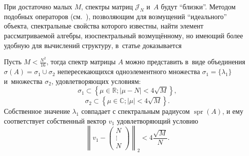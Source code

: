 При достаточно малых \( M \),
 спектры матриц \( \mathcal{J}_N \) и~\( A \) будут ``близки''.
Методом подобных операторов (см.~\cite{baskakov-harmonic,baskakov1983}),
 позволяющим для возмущений ``идеального'' объекта, спектральные свойства которого известны,
 найти элемент рассматриваемой алгебры, изоспектральный возмущ\"енному,
 но имеющий более удобную для вычислений структуру,
 в~статье доказывается
\begin{thm}\label{kozlukovsv:thm:almost-all-ones}
    Пусть \( M < \frac{N^2}{16} \),
    тогда спектр матрицы \( A \) можно представить в~виде
    объединения \( \sigma\left(A\right) = \sigma_1 \cup \sigma_2 \)
    непересекающихся
    одноэлементного множества \( \sigma_1=\{\lambda_1\} \)
    и~множества \( \sigma_2 \), удовлетворяющих условиям:
    \[ \sigma_1 \subset \left\{ \mu\in\mathbb{R}; \lvert \mu - N \rvert < 4\sqrt{M} \right\}, \]
    \[ \sigma_2 \subset \left\{ \mu\in\mathbb{C}; \lvert \mu \rvert < 4\sqrt{M} \right\}. \]
    Собственное значение \( \lambda_1 \) совпадает с спектральным радиусом
    \( \operatorname{spr}(A) \),
    и ему соответствует собственный вектор \( v_1 \)
    удовлетворяющий условию
    \[ \left\|v_1 - \begin{pmatrix} N\\ \vdots \\ N\end{pmatrix}\right\|_2 < 4\frac{\sqrt{M}}{N}. \]
\end{thm}
